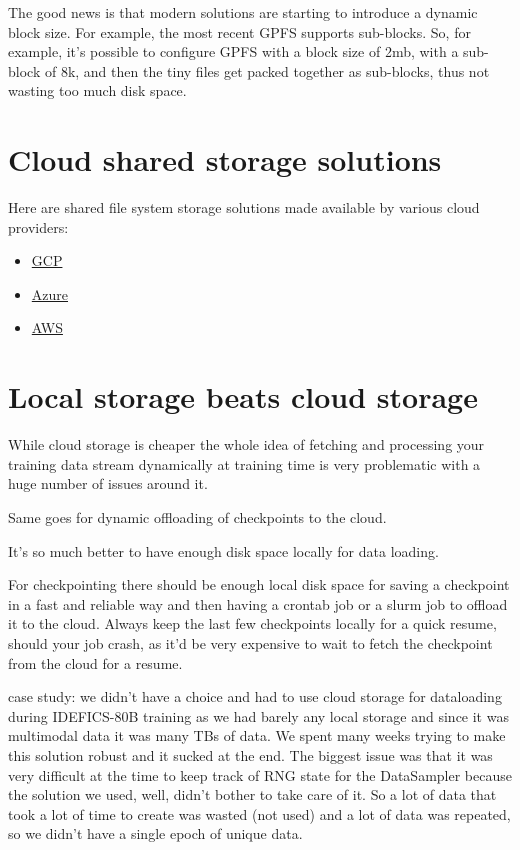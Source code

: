 \documentclass[
]{report}
\providecommand{\tightlist}{%
  \setlength{\itemsep}{0pt}\setlength{\parskip}{0pt}}\usepackage{longtable,booktabs,array}
\begin{document}
The good news is that modern solutions are starting to introduce a
dynamic block size. For example, the most recent GPFS supports
sub-blocks. So, for example, it's possible to configure GPFS with a
block size of 2mb, with a sub-block of 8k, and then the tiny files get
packed together as sub-blocks, thus not wasting too much disk space.

\section{Cloud shared storage
solutions}\label{cloud-shared-storage-solutions}

Here are shared file system storage solutions made available by various
cloud providers:

\begin{itemize}
\tightlist
\item
  \href{https://cloud.google.com/architecture/filers-on-compute-engine}{GCP}
\item
  \href{https://learn.microsoft.com/en-us/azure/virtual-machines/disks-shared}{Azure}
\item
  \href{https://aws.amazon.com/what-is/nas/\#seo-faq-pairs\#how-can-aws-help-with-storage-solutions}{AWS}
\end{itemize}

\section{Local storage beats cloud
storage}\label{local-storage-beats-cloud-storage}

While cloud storage is cheaper the whole idea of fetching and processing
your training data stream dynamically at training time is very
problematic with a huge number of issues around it.

Same goes for dynamic offloading of checkpoints to the cloud.

It's so much better to have enough disk space locally for data loading.

For checkpointing there should be enough local disk space for saving a
checkpoint in a fast and reliable way and then having a crontab job or a
slurm job to offload it to the cloud. Always keep the last few
checkpoints locally for a quick resume, should your job crash, as it'd
be very expensive to wait to fetch the checkpoint from the cloud for a
resume.

case study: we didn't have a choice and had to use cloud storage for
dataloading during IDEFICS-80B training as we had barely any local
storage and since it was multimodal data it was many TBs of data. We
spent many weeks trying to make this solution robust and it sucked at
the end. The biggest issue was that it was very difficult at the time to
keep track of RNG state for the DataSampler because the solution we
used, well, didn't bother to take care of it. So a lot of data that took
a lot of time to create was wasted (not used) and a lot of data was
repeated, so we didn't have a single epoch of unique data.
\end{document}
